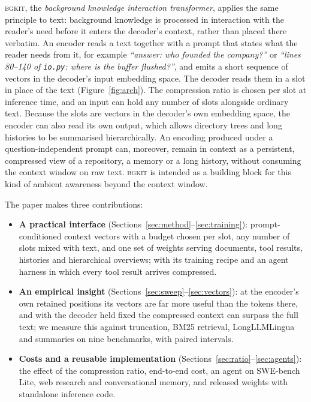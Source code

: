 \documentclass[11pt]{article}
\newcommand{\bgkit}{\textsc{bgkit}}
\begin{document}
\bgkit{}, the \emph{background knowledge interaction transformer}, applies the same principle to
text: background knowledge is processed in interaction with the reader's need before it enters the
decoder's context, rather than placed there verbatim. An encoder reads a text together with a prompt that states what the
reader needs from it, for example \emph{``answer: who founded the company?''} or \emph{``lines 80--140
of \texttt{io.py}: where is the buffer flushed?''}, and emits a short sequence of vectors in the
decoder's input embedding space. The decoder reads them in a slot in place of the text
(Figure~\ref{fig:arch}). The compression ratio is chosen per slot at inference time, and an input can
hold any number of slots alongside ordinary text. Because the slots are vectors in the decoder's own
embedding space, the encoder can also read its own output, which allows directory trees and long histories to be
summarised hierarchically. An encoding produced under a question-independent prompt can, moreover,
remain in context as a persistent, compressed view of a repository, a memory or a long history,
without consuming the context window on raw text. \bgkit{} is intended as a building block for this
kind of ambient awareness beyond the context window.

The paper makes three contributions:
\begin{itemize}
\item \textbf{A practical interface} (Sections~\ref{sec:method}--\ref{sec:training}): prompt-conditioned
  context vectors with a budget chosen per slot, any number of slots mixed with text, and one set of
  weights serving documents, tool results, histories and hierarchical overviews; with its training
  recipe and an agent harness in which every tool result arrives compressed.
\item \textbf{An empirical insight} (Sections~\ref{sec:sweep}--\ref{sec:vectors}): at the encoder's
  own retained positions its vectors are far more useful than the tokens there, and with the decoder
  held fixed the compressed context can surpass the full text; we measure this against truncation,
  BM25 retrieval, LongLLMLingua and summaries on nine benchmarks, with paired intervals.
\item \textbf{Costs and a reusable implementation} (Sections~\ref{sec:ratio}--\ref{sec:agents}): the
  effect of the compression ratio, end-to-end cost, an agent on SWE-bench Lite, web research and
  conversational memory, and released weights with standalone inference code.
\end{itemize}
\end{document}
